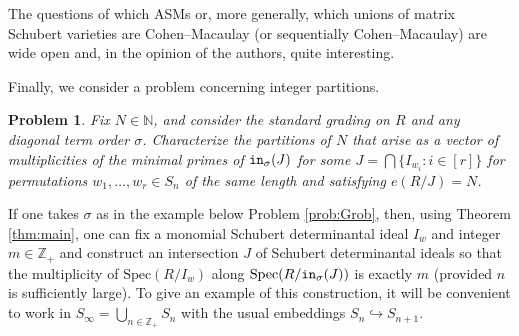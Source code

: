 \documentclass[12pt,reqno]{amsart}
\newtheorem{problem}[theorem]{Problem}
\newtheorem{Main Conjecture}[theorem]{Main Conjecture}
\theoremstyle{remark}
\theoremstyle{plain}
\newcommand{\init}{{\tt in}}
\newcommand{\ZZ}{\mathbb{Z}}
\newcommand{\NN}{\mathbb{N}}
\newcommand{\spec}{{\mbox{Spec}}}
\begin{document}
The questions of which ASMs or, more generally, which unions of matrix Schubert varieties are Cohen--Macaulay (or sequentially Cohen--Macaulay) are wide open and, in the opinion of the authors, quite interesting.  

Finally, we consider a problem concerning integer partitions.

\begin{problem}
Fix $N \in \NN$, and consider the standard grading on $R$ and any diagonal term order $\sigma$.  Characterize the partitions of $N$ that arise as a vector of multiplicities of the minimal primes of $\init_\sigma(J)$ for some 
$J =  \bigcap\{ I_{w_i}:i \in [r]\}$ 
for permutations $w_1, \ldots, w_r \in S_n$ of the same  length and satisfying $e(R/J) = N$.
\end{problem}

If one takes $\sigma$ as in the example below Problem \ref{prob:Grob}, then, using Theorem \ref{thm:main}, one can fix a monomial Schubert determinantal ideal $I_w$ and integer $m \in \ZZ_+$ and construct an intersection $J$ of Schubert determinantal ideals so that the multiplicity of $\spec(R/I_w)$ along $\spec(R/\init_\sigma(J))$ is exactly $m$ (provided $n$ is sufficiently large).  To give an example of this construction, it will be convenient to work in $S_{\infty} = \bigcup_{n \in \ZZ_+} S_n$ with the usual embeddings $S_n \hookrightarrow S_{n+1}$.  
\end{document}
